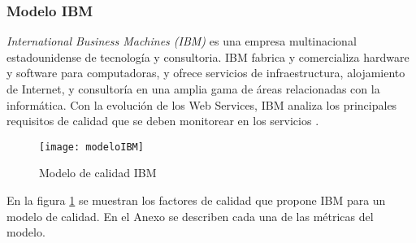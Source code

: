 \subsubsection{Modelo IBM}
\label{MarcoConceptual:modelo_IBM}
\emph{International Business Machines (IBM)} es una empresa multinacional estadounidense de tecnología y consultoria. IBM fabrica y comercializa hardware y software para computadoras, y ofrece servicios de infraestructura, alojamiento de Internet, y consultoría en una amplia gama de áreas relacionadas con la informática. Con la evolución de los Web Services, IBM analiza los principales requisitos de calidad que se deben monitorear en los servicios \cite{IBM:QoS}.
  \begin{figure}[h]
    \centering
    \texttt{[image: modeloIBM]}
    \caption{Modelo de calidad IBM}
    \label{figura:modelo_IBM}
  \end{figure}
En la figura \ref{figura:modelo_IBM} se muestran los factores de calidad que propone IBM para un modelo de calidad. En el Anexo se describen cada una de las métricas del modelo.
